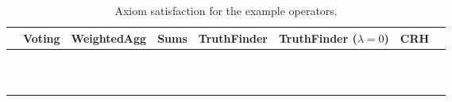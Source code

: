 \begin{table}
    \footnotesize
    \centering
    \caption{Axiom satisfaction for the example operators.}
    \def\yes{\checkmark}
    \def\no{\sffamily{X}}
    \begin{tabular}{lccccccc}

        &
        Voting             &
        WeightedAgg        &
        Sums               &
        TruthFinder        &
        TruthFinder ($\lambda = 0$)  &
        CRH                \\

        \toprule

        \claimcoherence{} &
            \yes{} &
            \yes{} &
            \yes{} &
            \\
        \sourcecoherence{} &
            \no{} &
            \no{} &
            \yes{} &
            \\
        \symmetry{} &
            \yes{} &
            \yes{} &
            \yes{} &
            \\
        \freshposresp{} &
            \yes{} &
            \yes{} &
            \no{} &
            \\
        \sourceposresp{} &
            \no{} &
            \yes{} &
            \no{} &
            \\
        \marginaltrustworthiness{} &
            \yes{} &
            \yes{} &
            \yes{} &
            \\
        \trustbasedmon{} &
            \yes{} &
            \yes{} &
            \yes{} &
            \\
        \classicalindependence{} &
            \yes{} &
            \no{} &
            \no{} &
            \\
        \disjointindependence{} &
            \yes{} &
            \yes{} &
            \no{} &
            \\
        \conflictcoherence{} &
            \no{} &
            \no{} &
            \no{} &
            \\
        \anticoherence{} &
            \no{} &
            \no{} &
            \no{} &
            \\

        \bottomrule

	\end{tabular}
    \label{td_new_tab_axiom_satisfaction}
\end{table}


